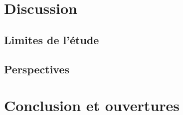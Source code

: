 \documentclass[12pt,a4paper]{article}
\begin{document}
\section{Discussion}
\noindent \lipsum[1-2]
\subsection{Limites de l'étude}
\noindent \lipsum[1-2]
\subsection{Perspectives}
\noindent \lipsum[1-2]


\section{Conclusion et ouvertures}
\noindent \noindent \lipsum[1-2]


\printbibliography
{}
\end{document}
